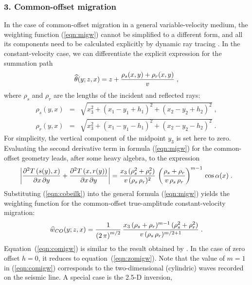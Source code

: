 \subsubsection{3. Common-offset migration}
In the case of common-offset migration in a general variable-velocity
medium, the weighting function (\ref{eqn:migw}) cannot be simplified to a
different form, and all its components need to be calculated
explicitly by dynamic ray tracing \cite[]{castro}.  In the
constant-velocity case, we can differentiate the explicit expression
for the summation path
\begin{equation}
\widehat{\theta}(y;z,x)  =  z + 
{{\rho_s(x,y) + \rho_r(x,y)} \over v}\;,
\end{equation}
where $\rho_s$ and
$\rho_r$ are the lengths of the incident and reflected rays:
\begin{eqnarray}
\rho_s(y,x) & = & 
\sqrt{x_3^2 + (x_1 - y_1 + h_1)^2 + (x_2 - y_2 + h_2)^2}\;,
 \\
\rho_r(y,x) & = & 
\sqrt{x_3^2 + (x_1 - y_1 - h_1)^ 2+ (x_2 - y_2 - h_2)^2}\;.
\end{eqnarray}
For simplicity, the vertical component of the midpoint $y_3$ is set here to zero. Evaluating the second derivative term in formula
(\ref{eqn:migw}) for the common-offset geometry leads, after some heavy
algebra, to the expression 
\begin{equation}
\left|{{\partial^2 T\left(s(y),x\right)} 
\over {\partial x\,\partial y}} +     
      {{\partial^2 T\left(x,r(y)\right)}
\over {\partial x\,\partial y}}\right| = 
{{x_3\,(\rho_s^2 + \rho_r^2)} \over {v\,(\rho_s\,\rho_r)^2}}\,
\left({{\rho_s + \rho_r} \over {v\,\rho_s\,\rho_r}}\right)^{m-1}
\,\cos{\alpha(x)}\;.
\label{eqn:cobeilk}
\end{equation}
Substituting (\ref{eqn:cobeilk}) into the general formula (\ref{eqn:migw}) yields
the weighting function for the common-offset true-amplitude
constant-velocity migration:
\begin{equation}
\widehat{w}_{CO}(y;z,x)  =  {1\over{\left(2\,\pi\right)^{m/2}}} \,
{{x_3\,(\rho_s + \rho_r)^{m-1}\,(\rho_s^2 + \rho_r^2)} \over 
{v\,(\rho_s\,\rho_r)^{m/2+1}}}\;.
\label{eqn:comigw}
\end{equation}
Equation~(\ref{eqn:comigw}) is similar to the result obtained by
\cite{GEO52-06-07450754}. In the case of zero offset $h=0$,
it reduces to equation~(\ref{eqn:zomigw}). Note that the value
of $m=1$ in (\ref{eqn:comigw}) corresponds to the two-dimensional (cylindric)
waves recorded on the seismic line. A special case is the 2.5-D inversion,
